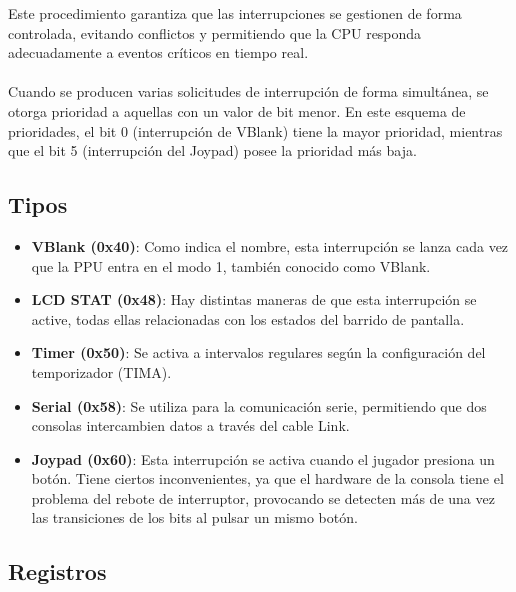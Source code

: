 Este procedimiento garantiza que las interrupciones se gestionen de forma controlada, evitando conflictos y permitiendo que la CPU responda adecuadamente a eventos críticos en tiempo real.
\\\\
Cuando se producen varias solicitudes de interrupción de forma simultánea, se otorga prioridad a aquellas con un valor de bit menor. En este esquema de prioridades, el bit 0 (interrupción de VBlank) tiene la mayor prioridad, mientras que el bit 5 (interrupción del Joypad) posee la prioridad más baja.

\subsection{Tipos}

\begin{itemize}
    \item \textbf{VBlank (0x40)}: Como indica el nombre, esta interrupción se lanza cada vez que la PPU entra en el modo 1, también conocido como VBlank.
    \item \textbf{LCD STAT (0x48)}: Hay distintas maneras de que esta interrupción se active, todas ellas relacionadas con los estados del barrido de pantalla.
    \item \textbf{Timer (0x50)}: Se activa a intervalos regulares según la configuración del temporizador (TIMA).
    \item \textbf{Serial (0x58)}: Se utiliza para la comunicación serie, permitiendo que dos consolas intercambien datos a través del cable Link.
    \item \textbf{Joypad (0x60)}: Esta interrupción se activa cuando el jugador presiona un botón. Tiene ciertos inconvenientes, ya que el hardware de la consola tiene el problema del rebote de interruptor, provocando se detecten más de una vez las transiciones de los bits al pulsar un mismo botón.
\end{itemize}
\label{interrupttype}

\subsection{Registros}

